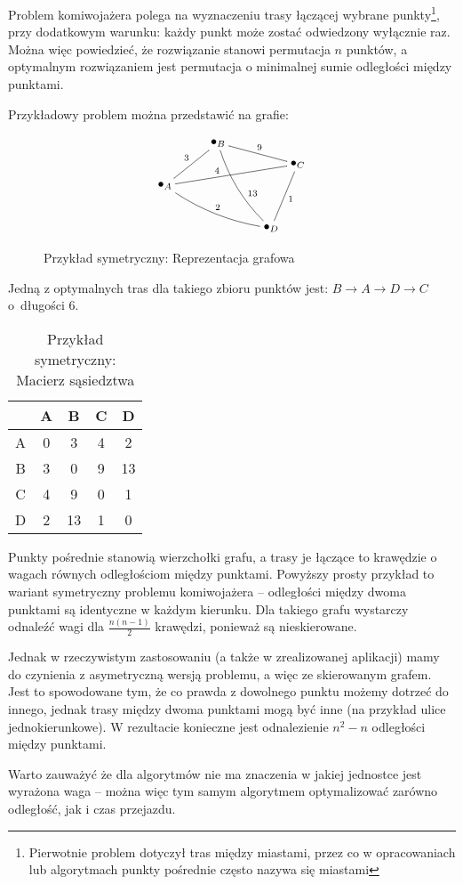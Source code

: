 Problem komiwojażera polega na wyznaczeniu trasy łączącej wybrane punkty\footnote{Pierwotnie problem dotyczył tras między miastami, przez co w opracowaniach lub algorytmach punkty pośrednie często nazywa się miastami}, przy dodatkowym warunku: każdy punkt może zostać odwiedzony wyłącznie raz. Można więc powiedzieć, że rozwiązanie stanowi permutacja $n$ punktów, a optymalnym rozwiązaniem jest permutacja o minimalnej sumie odległości między punktami\cite{genetyczne}.
		
Przykładowy problem można przedstawić na grafie:

\begin{figure}[h]
	\begin{displaymath}
	\xygraph{
		!{<0cm,0cm>;<1.5cm,0cm>:<0cm,1.2cm>::}
		!{(0,0) }*+{\bullet_{A}}="a"
		!{(1,1) }*+{\bullet_{B}}="b"
		!{(2.5,0.5) }*+{\bullet_{C}}="c"
		!{(2,-1)}*+{\bullet_{D}}="d"
		"a"-"b" ^3
		"a"-"c" ^(0.4)4
		"a"-@/_/"d" ^2
		"b"-"c" ^9
		"b"-@/_/"d" ^(0.6){13} 
		"c"-"d" ^1
	}
\end{displaymath}
\caption{Przykład symetryczny: Reprezentacja grafowa}
\end{figure}
Jedną z optymalnych tras dla takiego zbioru punktów jest: $B \to A \to D \to C$ o~długości 6.

\begin{table}
	
	\begin{center}
	\begin{tabular}
		{  c | c c c c }
		  & A & B & C & D \\
		\hline
		A & 0 & 3 & 4 & 2 \\
		B & 3 & 0 & 9 &13 \\
		C & 4 & 9 & 0 & 1 \\
		D & 2 &13 & 1 & 0 \\
	\end{tabular}
	\end{center}
	\caption{Przykład symetryczny: Macierz sąsiedztwa}
\end{table}

Punkty pośrednie stanowią wierzchołki grafu, a trasy je łączące to krawędzie o wagach równych odległościom między punktami. Powyższy prosty przykład to wariant symetryczny problemu komiwojażera -- odległości między dwoma punktami są identyczne w każdym kierunku. Dla takiego grafu wystarczy odnaleźć wagi dla $\frac{n(n-1)}{2}$ krawędzi, ponieważ są nieskierowane.

Jednak w rzeczywistym zastosowaniu (a także w zrealizowanej aplikacji) mamy do czynienia z asymetryczną wersją problemu, a więc ze skierowanym grafem. Jest to spowodowane tym, że co prawda z dowolnego punktu możemy dotrzeć do innego, jednak trasy między dwoma punktami mogą być inne (na przykład ulice jednokierunkowe). W rezultacie konieczne jest odnalezienie $n^2-n$ odległości między punktami.

Warto zauważyć że dla algorytmów nie ma znaczenia w jakiej jednostce jest wyrażona waga -- można więc tym samym algorytmem optymalizować zarówno odległość, jak i czas przejazdu.